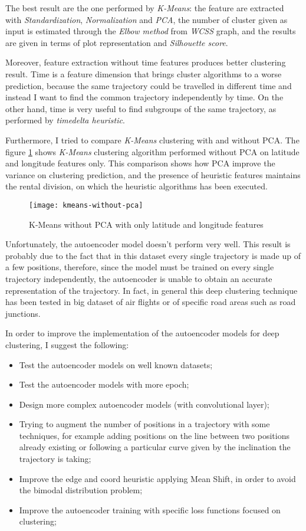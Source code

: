 The best result are the one performed by \textit{K-Means}: the feature are extracted with \textit{Standardization}, \textit{Normalization} and \textit{PCA}, the number of cluster given as input is estimated through the \textit{Elbow method} from \textit{WCSS} graph, and the results are given in terms of plot representation and \textit{Silhouette score}. 

Moreover, feature extraction without time features produces better clustering result. Time is a feature dimension that brings cluster algorithms to a worse prediction, because the same trajectory could be travelled in different time and instead I want to find the common trajectory independently by time. On the other hand, time is very useful to find subgroups of the same trajectory, as performed by \textit{timedelta heuristic}.

Furthermore, I tried to compare \textit{K-Means} clustering with and without PCA. The figure \ref{fig:kmeans-without-pca} shows \textit{K-Means} clustering algorithm performed without PCA on latitude and longitude features only. This comparison shows how PCA improve the variance on clustering prediction, and the presence of heuristic features maintains the rental division, on which the heuristic algorithms has been executed.  

\begin{figure}[bt]
	\centering
	\texttt{[image: kmeans-without-pca]}
	\caption{K-Means without PCA with only latitude and longitude features}
	\label{fig:kmeans-without-pca}
\end{figure}

Unfortunately, the autoencoder model doesn't perform very well. This result is probably due to the fact that in this dataset every single trajectory is made up of a few positions, therefore, since the model must be trained on every single trajectory independently, the autoencoder is unable to obtain an accurate representation of the trajectory. In fact, in general this deep clustering technique has been tested in big dataset of air flights or of specific road areas such as road junctions. 

In order to improve the implementation of the autoencoder models for deep clustering, I suggest the following:
\begin{itemize}
	\item Test the autoencoder models on well known datasets;
	\item Test the autoencoder models with more epoch;
	\item Design more complex autoencoder models (with convolutional layer);
	\item Trying to augment the number of positions in a trajectory with some techniques, for example adding positions on the line between two positions already existing or following a particular curve given by the inclination the trajectory is taking;
	\item Improve the edge and coord heuristic applying Mean Shift, in order to avoid the bimodal distribution problem;
	\item Improve the autoencoder training with specific loss functions focused on clustering; 
\end{itemize}
